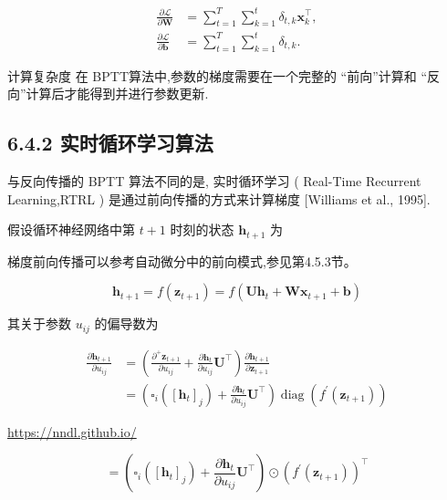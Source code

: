\documentclass[10pt]{article}
\begin{document}
\begin{align*}
\frac{\partial \mathcal{L}}{\partial \boldsymbol{W}} & =\sum_{t=1}^{T} \sum_{k=1}^{t} \delta_{t, k} \boldsymbol{x}_{k}^{\top},  \tag{6.40}\\
\frac{\partial \mathcal{L}}{\partial \boldsymbol{b}} & =\sum_{t=1}^{T} \sum_{k=1}^{t} \delta_{t, k} . \tag{6.41}
\end{align*}


计算复杂度 在 BPTT算法中,参数的梯度需要在一个完整的 “前向”计算和 “反向”计算后才能得到并进行参数更新.

\subsection*{6.4.2 实时循环学习算法}
与反向传播的 BPTT 算法不同的是, 实时循环学习 ( Real-Time Recurrent Learning,RTRL ) 是通过前向传播的方式来计算梯度 [Williams et al., 1995].

假设循环神经网络中第 $t+1$ 时刻的状态 $\boldsymbol{h}_{t+1}$ 为

梯度前向传播可以参考自动微分中的前向模式,参见第4.5.3节。


\begin{equation*}
\boldsymbol{h}_{t+1}=f\left(\boldsymbol{z}_{t+1}\right)=f\left(\boldsymbol{U} \boldsymbol{h}_{t}+\boldsymbol{W} \boldsymbol{x}_{t+1}+\boldsymbol{b}\right) \tag{6.42}
\end{equation*}


其关于参数 $u_{i j}$ 的偏导数为


\begin{align*}
\frac{\partial \boldsymbol{h}_{t+1}}{\partial u_{i j}} & =\left(\frac{\partial^{+} \boldsymbol{z}_{t+1}}{\partial u_{i j}}+\frac{\partial \boldsymbol{h}_{t}}{\partial u_{i j}} \boldsymbol{U}^{\top}\right) \frac{\partial \boldsymbol{h}_{t+1}}{\partial \boldsymbol{z}_{t+1}}  \tag{6.43}\\
& =\left(\square_{i}\left(\left[\boldsymbol{h}_{t}\right]_{j}\right)+\frac{\partial \boldsymbol{h}_{t}}{\partial u_{i j}} \boldsymbol{U}^{\top}\right) \operatorname{diag}\left(f^{\prime}\left(\boldsymbol{z}_{t+1}\right)\right) \tag{6.44}
\end{align*}


\href{https://nndl.github.io/}{https://nndl.github.io/}


\begin{equation*}
=\left(\mathbb{\square}_{i}\left(\left[\boldsymbol{h}_{t}\right]_{j}\right)+\frac{\partial \boldsymbol{h}_{t}}{\partial u_{i j}} \boldsymbol{U}^{\top}\right) \odot\left(f^{\prime}\left(\boldsymbol{z}_{t+1}\right)\right)^{\top} \tag{6.45}
\end{equation*}
\end{document}
